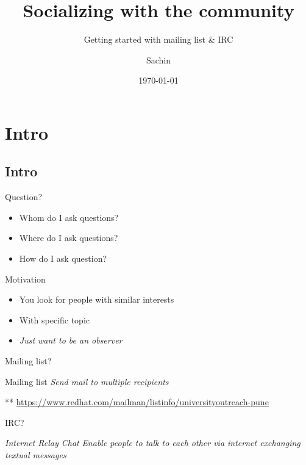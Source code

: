 \documentclass[10pt]{beamer}
\subtitle{Getting started with mailing list \& IRC}
\institute{Red Hat}
\author{Sachin}
\date{\today}
\title{Socializing with the community}
\begin{document}
\maketitle



\section{Intro}
\label{sec:org7938915}
\subsection{Intro}
\label{sec:orge0b9813}
\begin{frame}[label={sec:org767c7d5}]{Question?}
\begin{itemize}
\item Whom do I ask questions?
\item Where do I ask questions?
\item How do I ask question?
\end{itemize}
\end{frame}

\begin{frame}[label={sec:org0c904cb}]{Motivation}
\begin{itemize}
\item You look for people with similar interests
\item With specific topic
\item \emph{Just want to be an observer}
\end{itemize}
\end{frame}

\begin{frame}[label={sec:org5afb82a}]{Mailing list?}
\begin{block}{Mailing list}
\emph{Send mail to multiple recipients}

\alert{**}
	 \url{https://www.redhat.com/mailman/listinfo/universityoutreach-pune}
\end{block}
\end{frame}

\begin{frame}[label={sec:orge114330}]{IRC?}
\begin{block}{\emph{Internet Relay Chat}}
   \emph{Enable people to talk to each other via \alert{internet} exchanging
textual messages}
\end{block}
\end{frame}
\end{document}
